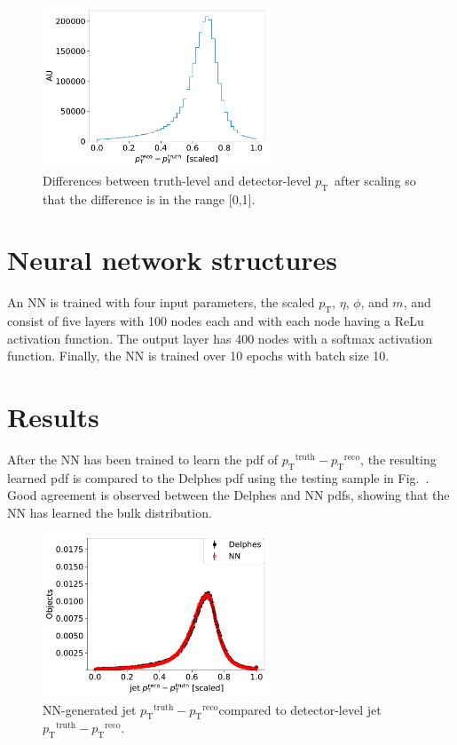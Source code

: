 \documentclass[showpacs,showkeys,preprint,prd,nofootinbib,linenumbers,12pt]{revtex4-1}
\def\pt{\ensuremath{p_{\mathrm{T}}}}
\def\ptRes{\ensuremath{\pt^{\mathrm{truth}}-\pt^{\mathrm{reco}}}}
\begin{document}
\begin{figure}[h]
  \includegraphics[width=0.6\textwidth]{pTRes_bounds_scaled.pdf}
  \caption{Differences between truth-level and detector-level \pt\ after scaling so that the difference is in the range [0,1].}
  \label{fig:deltaTarget}
\end{figure}

\section{Neural network structures}

An NN is trained with four input parameters, the scaled \pt, $\eta$, $\phi$, and $m$, and consist of five layers with 100 nodes each and with each node having a ReLu~\cite{relu} activation function. The output layer has 400 nodes with a softmax activation function. Finally, the NN is trained over 10 epochs with batch size 10.

\section{Results}

After the NN has been trained to learn the pdf of \ptRes, the resulting learned pdf is compared to the Delphes pdf using the testing sample in Fig.~\cite{fig:pdfComp}. Good agreement is observed between the Delphes and NN pdfs, showing that the NN has learned the bulk distribution.

\begin{figure}[htb]
  \includegraphics[width=0.6\textwidth]{jet_pTRes.pdf}
  \caption{NN-generated jet \ptRes compared to detector-level jet \ptRes.}
  \label{fig:pdfComp}
\end{figure}
\end{document}
